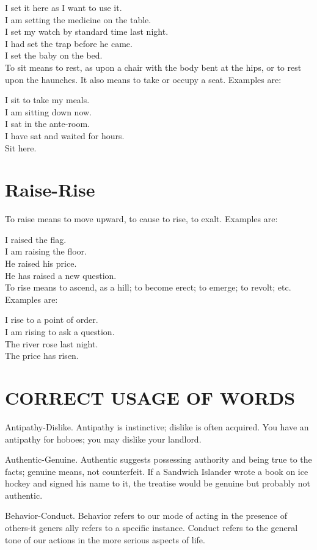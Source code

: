 \documentclass[10pt]{article}
\begin{document}
I set it here as I want to use it.\\
I am setting the medicine on the table.\\
I set my watch by standard time last night.\\
I had set the trap before he came.\\
I set the baby on the bed.\\
To sit means to rest, as upon a chair with the body bent at the hips, or to rest upon the haunches. It also means to take or occupy a seat. Examples are:

I sit to take my meals.\\
I am sitting down now.\\
I sat in the ante-room.\\
I have sat and waited for hours.\\
Sit here.

\section*{Raise-Rise}
To raise means to move upward, to cause to rise, to exalt. Examples are:

I raised the flag.\\
I am raising the floor.\\
He raised his price.\\
He has raised a new question.\\
To rise means to ascend, as a hill; to become erect; to emerge; to revolt; etc. Examples are:

I rise to a point of order.\\
I am rising to ask a question.\\
The river rose last night.\\
The price has risen.

\section*{CORRECT USAGE OF WORDS}
Antipathy-Dislike. Antipathy is instinctive; dislike is often acquired. You have an antipathy for hoboes; you may dislike your landlord.

Authentic-Genuine. Authentic suggests possessing authority and being true to the facts; genuine means, not counterfeit. If a Sandwich Islander wrote a book on ice hockey and signed his name to it, the treatise would be genuine but probably not authentic.

Behavior-Conduct. Behavior refers to our mode of acting in the presence of others-it geners ally refers to a specific instance. Conduct refers to the general tone of our actions in the more serious aspects of life.
\end{document}
